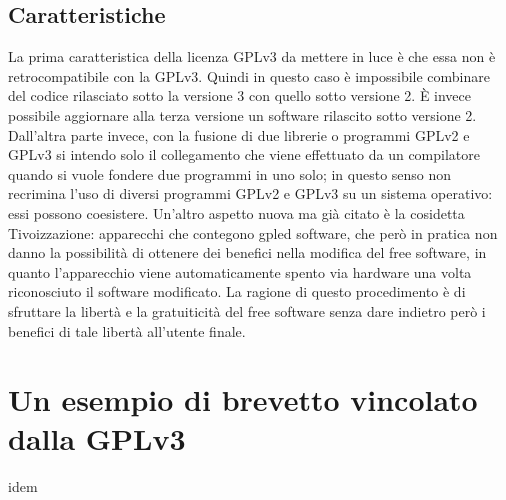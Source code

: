 \subsection{Caratteristiche}
La prima caratteristica della licenza GPLv3 da mettere in luce è che essa non è retrocompatibile con la GPLv3. Quindi in questo caso è impossibile combinare del codice rilasciato sotto la versione 3 con quello sotto versione 2. \`E invece possibile aggiornare alla terza versione un software rilascito sotto versione 2. Dall'altra parte invece, con la fusione di due librerie o programmi GPLv2 e GPLv3 si intendo solo il collegamento che viene effettuato da un compilatore quando si vuole fondere due programmi in uno solo; in questo senso non recrimina l'uso di diversi programmi GPLv2 e GPLv3 su un sistema operativo: essi possono coesistere.
Un'altro aspetto nuova ma già citato è la cosidetta Tivoizzazione: apparecchi che contegono gpled software, che però in pratica non danno la possibilità di ottenere dei benefici nella modifica del free software, in quanto l'apparecchio viene automaticamente spento via hardware una volta riconosciuto il software modificato. La ragione di questo procedimento è di sfruttare la libertà e la gratuiticità del free software senza dare indietro però i benefici di tale libertà all'utente finale.











\section{Un esempio di brevetto vincolato dalla GPLv3}
idem

